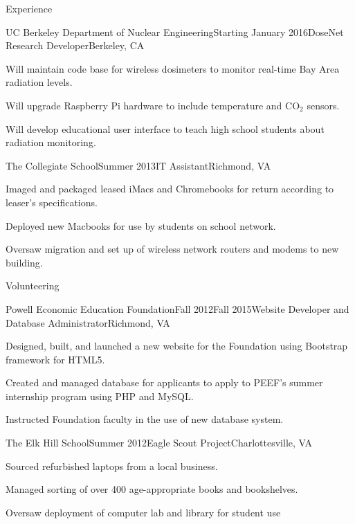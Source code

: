 \documentclass{resume} %
\begin{document}
\begin{rSection}{Experience}
\begin{rSubsection}{UC Berkeley Department of Nuclear Engineering}{Starting January 2016}{DoseNet Research Developer}{Berkeley, CA}
\item Will maintain code base for wireless dosimeters to monitor real-time Bay Area radiation levels.
\item Will upgrade Raspberry Pi hardware to include temperature and CO$_2$ sensors. 
\item Will develop educational user interface to teach high school students about radiation monitoring.
\end{rSubsection}
\begin{rSubsection}{The Collegiate School}{Summer 2013}{IT Assistant}{Richmond, VA}
\item Imaged and packaged leased iMacs and Chromebooks for return according to leaser's specifications.
\item Deployed new Macbooks for use by students on school network.
\item Oversaw migration and set up of wireless network routers and modems to new building.
\end{rSubsection}
\end{rSection}


\begin{rSection}{Volunteering}

\begin{rSubsection}{Powell Economic Education Foundation}{Fall 2012\textminus Fall 2015}{Website Developer and Database Administrator}{Richmond, VA}
\item Designed, built, and launched a new website for the Foundation using Bootstrap framework for HTML5.
\item Created and managed database for applicants to apply to PEEF's summer internship program using PHP and MySQL.
\item Instructed Foundation faculty in the use of new database system.
\end{rSubsection}

\begin{rSubsection}{The Elk Hill School}{Summer 2012}{Eagle Scout Project}{Charlottesville, VA}
\item Sourced refurbished laptops from a local business.
\item Managed sorting of over 400 age-appropriate books and bookshelves.
\item Oversaw deployment of computer lab and library for student use
\end{rSubsection}

\end{rSection}
\end{document}
